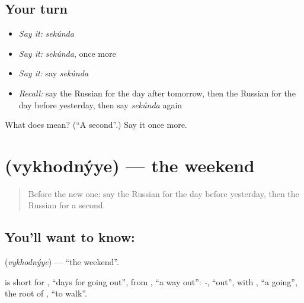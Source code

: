 \subsection*{Your turn}
\begin{itemize}
\raggedright
  \item \emph{Say it:} \emph{sekúnda}
  \item \emph{Say it:} \emph{sekúnda}, once more
  \item \emph{Say it:} say \emph{sekúnda}
  \item \emph{Recall:} say the Russian for the day after tomorrow, then the Russian for the day before yesterday, then say \emph{sekúnda} again
\end{itemize}

\begin{tcolorbox}[breakable,colback=teal!4,colframe=teal!35!black,title={Before you move on}]
What does  mean? (\textquotedblleft{}A second\textquotedblright{}.) Say it once more.
\end{tcolorbox}
\section[\texorpdfstring{\ru{выходные} (vykhodnýye)}{выходные (vykhodnýye)}]{ (vykhodnýye) — the weekend}

\label{lesson:RU-C85-weekend}



\begin{quote}
Before the new one: say the Russian for the day before yesterday, then the Russian for a second.
\end{quote}

\subsection*{You'll want to know: }
\textbf{} (\emph{vykhodnýye}) — \textquotedblleft{}the weekend\textquotedblright{}.

\begin{cousinweb}
\textbf{} is short for \emph{ }, \textquotedblleft{}days for going out\textquotedblright{}, from \emph{}, \textquotedblleft{}a way out\textquotedblright{}: \emph{-}, \textquotedblleft{}out\textquotedblright{}, with \emph{}, \textquotedblleft{}a going\textquotedblright{}, the root of \emph{}, \textquotedblleft{}to walk\textquotedblright{}.
\end{cousinweb}

